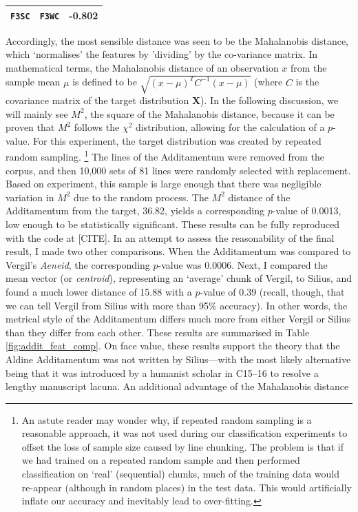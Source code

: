 \documentclass[11pt,a4paper]{scrartcl} %
\begin{document}
{\begin{table}
{\begin{tabular}{ | l | l | c |}
\texttt{F3SC} & \texttt{F3WC} & -0.802 \\
\hline
\end{tabular}}
\end{table}
Accordingly, the most sensible distance was seen to be the Mahalanobis distance, which `normalises' the features by 'dividing' by the co-variance matrix. In mathematical terms, the Mahalanobis distance of an observation $x$ from the sample mean $\mu$ is defined to be $\sqrt{(x-\mu)^{T}C^{-1}(x-\mu)}$ (where $C$ is the covariance matrix of the target distribution $\textbf{X}$). In the following discussion, we will mainly see $M^{2}$, the square of the Mahalanobis distance, because it can be proven that $M^{2}$ follows the $\chi^{2}$ distribution, allowing for the calculation of a $p$-value. For this experiment, the target distribution was created by repeated random sampling.%
\footnote{An astute reader may wonder why, if repeated random sampling is a reasonable approach, it was not used during our classification experiments to offset the loss of sample size caused by line chunking. The problem is that if we had trained on a repeated random sample and then performed classification on `real' (sequential) chunks, much of the training data would re-appear (although in random places) in the test data. This would artificially inflate our accuracy and inevitably lead to over-fitting.}
The lines of the Additamentum were removed from the corpus, and then 10,000 sets of 81 lines were randomly selected with replacement. Based on experiment, this sample is large enough that there was negligible variation in $M^{2}$ due to the random process. The $M^{2}$ distance of the Additamentum from the target, 36.82, yields a corresponding $p$-value of 0.0013, low enough to be statistically significant. These results can be fully reproduced with the code at [CITE]. In an attempt to assess the reasonability of the final result, I made two other comparisons. When the Additamentum was compared to Vergil's \textit{Aeneid}, the corresponding $p$-value was 0.0006. Next, I compared the mean vector (or \textit{centroid}), representing an `average' chunk of Vergil, to Silius, and found a much lower distance of 15.88 with a $p$-value of 0.39 (recall, though, that we can tell Vergil from Silius with more than 95\% accuracy). In other words, the metrical style of the Additamentum differs much more from either Vergil or Silius than they differ from each other. These results are summarised in Table \ref{fig:addit_feat_comp}. On face value, these results support the theory that the Aldine Additamentum was not written by Silius---with the most likely alternative being that it was introduced by a humanist scholar in C15--16 to resolve a lengthy manuscript lacuna. An additional advantage of the Mahalanobis distance%
}
\end{document}
